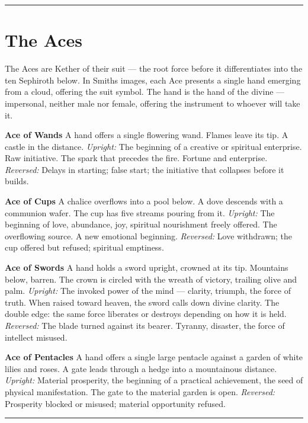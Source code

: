 \begin{center}\rule{0.5\linewidth}{0.5pt}\end{center}

\section{The Aces}\label{the-aces}

The Aces are Kether of their suit --- the root force before it differentiates into the ten Sephiroth below. In Smith\textquotesingle s images, each Ace presents a single hand emerging from a cloud, offering the suit symbol. The hand is the hand of the divine --- impersonal, neither male nor female, offering the instrument to whoever will take it.

\textbf{Ace of Wands} A hand offers a single flowering wand. Flames leave its tip. A castle in the distance. \emph{Upright:} The beginning of a creative or spiritual enterprise. Raw initiative. The spark that precedes the fire. Fortune and enterprise. \emph{Reversed:} Delays in starting; false start; the initiative that collapses before it builds.

\textbf{Ace of Cups} A chalice overflows into a pool below. A dove descends with a communion wafer. The cup has five streams pouring from it. \emph{Upright:} The beginning of love, abundance, joy, spiritual nourishment freely offered. The overflowing source. A new emotional beginning. \emph{Reversed:} Love withdrawn; the cup offered but refused; spiritual emptiness.

\textbf{Ace of Swords} A hand holds a sword upright, crowned at its tip. Mountains below, barren. The crown is circled with the wreath of victory, trailing olive and palm. \emph{Upright:} The invoked power of the mind --- clarity, triumph, the force of truth. When raised toward heaven, the sword calls down divine clarity. The double edge: the same force liberates or destroys depending on how it is held. \emph{Reversed:} The blade turned against its bearer. Tyranny, disaster, the force of intellect misused.

\textbf{Ace of Pentacles} A hand offers a single large pentacle against a garden of white lilies and roses. A gate leads through a hedge into a mountainous distance. \emph{Upright:} Material prosperity, the beginning of a practical achievement, the seed of physical manifestation. The gate to the material garden is open. \emph{Reversed:} Prosperity blocked or misused; material opportunity refused.

\begin{center}\rule{0.5\linewidth}{0.5pt}\end{center}

